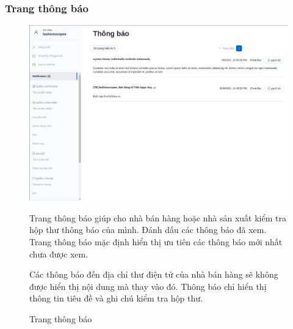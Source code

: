 \subsubsection{Trang thông báo}
\FloatBarrier
\begin{figure}[!htbp]\fontsize{13px}{13px}\selectfont
\centering
		\includegraphics[width=\textwidth]{./results/notifications}
		\caption{Trang thông báo}
\justifying
Trang thông báo giúp cho nhà bán hàng hoặc nhà sản xuất kiểm tra hộp thư thông báo của mình. Đánh dấu các thông báo đã xem. Trang thông báo mặc định hiển thị ưu tiên các thông báo mới nhất chưa được xem.

Các thông báo đến địa chỉ thư điện tử của nhà bán hàng sẽ không được hiển thị nội dung mà thay vào đó. Thông báo chỉ hiển thị thông tin tiêu đề và ghi chú kiểm tra hộp thư.
\end{figure}
\clearpage
